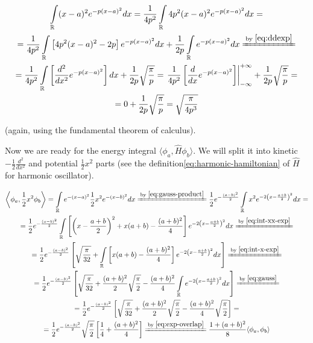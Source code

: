 \documentclass{article}
\newcommand{\equalby}[1]{\xlongequal{\text{by }\eqref{#1}}}
\newcommand{\intR}{\int\limits_\mathbb R}
\begin{document}
\begin{equation} \label{eq:int-xx-exp}
\begin{gathered}
\intR (x-a)^2 e^{-p(x-a)^2} dx = \frac{1}{4p^2} \intR 4p^2 (x-a)^2 e^{-p(x-a)^2} dx = \\
= \frac{1}{4p^2} \intR \left[ 4p^2 (x-a)^2 - 2p \right] e^{-p(x-a)^2} dx + \frac{1}{2p} \intR e^{-p(x-a)^2} dx \equalby{eq:ddexp} \\
= \frac{1}{4p^2} \intR \left[\frac{d^2}{dx^2} e^{-p(x-a)^2}\right]dx + \frac{1}{2p} \sqrt\frac{\pi}{p} = \left. \frac{1}{4p^2} \left[\frac{d}{dx} e^{-p(x-a)^2}\right] \right\vert_{-\infty}^{+\infty} + \frac{1}{2p}\sqrt\frac{\pi}{p} = \\
= 0 + \frac{1}{2p}\sqrt\frac{\pi}{p} = \sqrt\frac{\pi}{4p^3}
\end{gathered}
\end{equation}

(again, using the fundamental theorem of calculus).

Now we are ready for the energy integral \(\langle \phi_a, \hat H\phi_b\rangle\). We will split it into kinetic \(-\frac{1}{2}\frac{d^2}{dx^2}\) and potential \(\frac{1}{2}x^2\) parts (see the definition\eqref{eq:harmonic-hamiltonian} of \(\hat H\) for harmonic oscillator).

\begin{equation} \label{eq:exp-potential}
\begin{gathered}
\left\langle \phi_a , \frac{1}{2} x^2 \phi_b \right\rangle = \intR e^{-(x-a)^2} \frac{1}{2} x^2 e^{-(x-b)^2} dx \equalby{eq:gauss-product} \frac{1}{2} e^{-\frac{(a-b)^2}{2}} \intR x^2 e^{-2\left(x-\frac{a+b}{2}\right)^2} dx = \\
= \frac{1}{2} e^{-\frac{(a-b)^2}{2}} \intR \left[\left( x-\frac{a+b}{2} \right)^2 + x(a+b) - \frac{(a+b)^2}{4} \right] e^{-2\left(x-\frac{a+b}{2}\right)^2} dx \equalby{eq:int-xx-exp} \\
= \frac{1}{2} e^{-\frac{(a-b)^2}{2}} \left[ \sqrt\frac{\pi}{32} + \intR \left[ x(a+b) - \frac{(a+b)^2}{4} \right] e^{-2\left(x-\frac{a+b}{2}\right)^2} dx \right] \equalby{eq:int-x-exp} \\
= \frac{1}{2} e^{-\frac{(a-b)^2}{2}} \left[ \sqrt\frac{\pi}{32} + \frac{(a+b)^2}{2}\sqrt\frac{\pi}{2} - \frac{(a+b)^2}{4} \intR e^{-2\left(x-\frac{a+b}{2}\right)^2} dx \right] \equalby{eq:gauss} \\
= \frac{1}{2} e^{-\frac{(a-b)^2}{2}} \left[ \sqrt\frac{\pi}{32} + \frac{(a+b)^2}{2}\sqrt\frac{\pi}{2} - \frac{(a+b)^2}{4} \sqrt\frac{\pi}{2} \right] = \\
= \frac{1}{2} e^{-\frac{(a-b)^2}{2}} \sqrt\frac{\pi}{2} \left[ \frac{1}{4} + \frac{(a+b)^2}{4} \right] \equalby{eq:exp-overlap} \frac{1+(a+b)^2}{8} \langle \phi_a, \phi_b \rangle
\end{gathered}
\end{equation}
\end{document}
